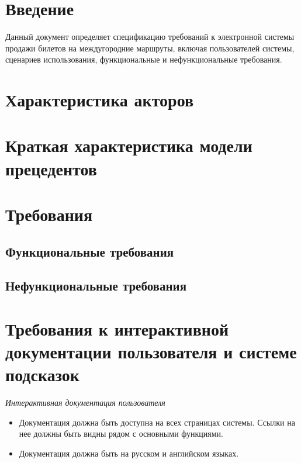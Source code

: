 \section{Введение}

Данный документ определяет спецификацию требований к
электронной системы продажи билетов на междугородние маршруты, включая
пользователей системы, сценариев использования,
функциональные и нефункциональные требования.

\section{Характеристика акторов}


\section{Краткая характеристика модели прецедентов}


\newpage
\section{Требования}
\subsection{Функциональные требования}


\subsection{Нефункциональные требования}


\section{Требования к интерактивной документации пользователя и системе подсказок}

\begin{center}
    \textit{Интерактивная документация пользователя}
\end{center}

\begin{itemize}
    \item Документация должна быть доступна на всех страницах
    системы. Ссылки на нее должны быть видны рядом с основными функциями.
    \item Документация должна быть на русском и английском
    языках.
\end{itemize}

